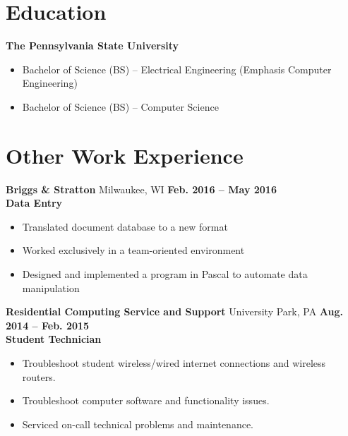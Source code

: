 \documentclass[letterpaper,10pt]{article}
\begin{document}
\section{Education}
\textbf{The Pennsylvania State University}
\begin{itemize}
\item Bachelor of Science (BS) -- Electrical Engineering (Emphasis Computer Engineering)
\item Bachelor of Science (BS) -- Computer Science
\end{itemize}

\section{Other Work Experience}
\textbf{Briggs \& Stratton} Milwaukee, WI \hfill \textbf{Feb. 2016 -- May 2016}\\
\textbf{Data Entry}
\begin{itemize}
\item Translated document database to a new format
\item Worked exclusively in a team-oriented environment
\item Designed and implemented a program in Pascal to automate data manipulation
\end{itemize}
\textbf{Residential Computing Service and Support} University Park, PA \hfill \textbf{Aug. 2014 – Feb. 2015}\\
\textbf{Student Technician}
\begin{itemize}
\item Troubleshoot student wireless/wired internet connections and wireless routers.
\item Troubleshoot computer software and functionality issues.
\item Serviced on-call technical problems and maintenance.
\end{itemize}
\end{document}
